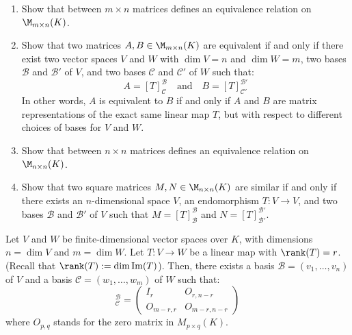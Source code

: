 \begin{exercise}
\begin{enumerate}
    \item Show that  between $m \times n$ matrices defines an equivalence relation on $\M_{m \times n}(K)$.
    \item Show that two matrices $A, B \in \M_{m \times n}(K)$ are equivalent if and only if there exist two vector spaces $V$ and $W$ with $\dim V = n$ and $\dim W = m$, two bases $\mathcal{B}$ and $\mathcal{B}'$ of $V$, and two bases $\mathcal{C}$ and $\mathcal{C}'$ of $W$ such that:
    \begin{equation*}
        A = [T]_{\mathcal{C}}^{\mathcal{B}} \quad \text{and} \quad B = [T]_{\mathcal{C}'}^{\mathcal{B}'}
    \end{equation*}
    In other words, $A$ is equivalent to $B$ if and only if $A$ and $B$ are matrix representations of the exact same linear map $T$, but with respect to different choices of bases for $V$ and $W$.
    \item Show that  between $n \times n$ matrices defines an equivalence relation on $\M_{n \times n}(K)$.
    \item Show that two square matrices $M, N \in \M_{n \times n}(K)$ are similar if and only if there exists an $n$-di\-men\-sional space $V$, an endomorphism $T: V \to V$, and two bases $\mathcal{B}$ and $\mathcal{B}'$ of $V$ such that $M = [T]_{\mathcal{B}}^{\mathcal{B}}$ and $N = [T]_{\mathcal{B}'}^{\mathcal{B}'}$.
\end{enumerate}
\end{exercise}

\begin{proposition}
\label{prop:linear_map_normal_form}
Let $V$ and $W$ be finite-di\-men\-sional vector spaces over $K$, with dimensions $n = \dim V$ and $m = \dim W$. Let $T: V \to W$ be a linear map with $\rank(T) = r$. (Recall that $\rank(T) := \dim \operatorname{Im}(T)$). Then, there exists a basis $\mathcal{B} = (v_1, \dots, v_n)$ of $V$ and a basis $\mathcal{C} = (w_1, \dots, w_m)$ of $W$ such that:
\begin{equation*}
    [T]_{\mathcal{C}}^{\mathcal{B}} = \begin{pmatrix} I_r & O_{r, n-r} \\ O_{m-r, r} & O_{m-r, n-r} \end{pmatrix}
\end{equation*}
where $O_{p,q}$ stands for the zero matrix in $M_{p \times q}(K)$.
\end{proposition}

